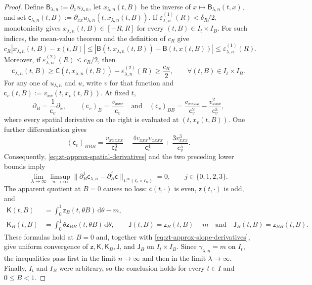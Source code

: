 \documentclass[10pt]{amsart}
\theoremstyle{definition}
\theoremstyle{remark}
\numberwithin{equation}{section}
\newcommand{\1}{\mathbf 1}
\newcommand{\dd}{\,\mathrm d}
\begin{document}
\begin{proof}
Define $\mathsf B_{\lambda,n}:=\partial_xu_{\lambda,n}$, let $x_{\lambda,n}(t,B)$ be the inverse of $x\mapsto\mathsf B_{\lambda,n}(t,x)$, and set $\mathsf c_{\lambda,n}(t,B):=\partial_{xx}u_{\lambda,n}(t,x_{\lambda,n}(t,B))$. If $\varepsilon_{\lambda,n}^{(1)}(R)<\delta_R/2$, monotonicity gives $x_{\lambda,n}(t,B)\in[-R,R]$ for every $(t,B)\in I_t\times I_B$. For such indices, the mean-value theorem and the definition of $c_R$ give
\begin{equation*}
 c_R|x_{\lambda,n}(t,B)-x(t,B)|
 \leq|\mathsf B(t,x_{\lambda,n}(t,B))-\mathsf B(t,x(t,B))|
 \leq\varepsilon_{\lambda,n}^{(1)}(R).
\end{equation*}
Moreover, if $\varepsilon_{\lambda,n}^{(2)}(R)\leq c_R/2$, then
\begin{equation*}
 \mathsf c_{\lambda,n}(t,B)\geq\mathsf C(t,x_{\lambda,n}(t,B))-\varepsilon_{\lambda,n}^{(2)}(R)\geq\frac{c_R}{2},
 \qquad \forall (t,B)\in I_t\times I_B.
\end{equation*}
For any one of $u_{\lambda,n}$ and $u$, write $v$ for that function and $\mathsf c_v(t,B):=v_{xx}(t,x_v(t,B))$. At fixed $t$,
\begin{equation*}
 \partial_B=\frac1{\mathsf c_v}\partial_x,\qquad (\mathsf c_v)_B=\frac{v_{xxx}}{\mathsf c_v}
 \quad\text{and}\quad
 (\mathsf c_v)_{BB}=\frac{v_{xxxx}}{\mathsf c_v^2}-\frac{v_{xxx}^2}{\mathsf c_v^3},
\end{equation*}
where every spatial derivative on the right is evaluated at $(t,x_v(t,B))$. One further differentiation gives
\begin{equation*}
 (\mathsf c_v)_{BBB}=\frac{v_{xxxxx}}{\mathsf c_v^3}
 -\frac{4v_{xxx}v_{xxxx}}{\mathsf c_v^4}
 +\frac{3v_{xxx}^3}{\mathsf c_v^5}.
\end{equation*}
Consequently, \eqref{eq:zt-approx-spatial-derivatives} and the two preceding lower bounds imply
\begin{equation}
 \lim_{\lambda\to\infty}\limsup_{n\to\infty}
 \|\partial_B^j\mathsf c_{\lambda,n}-\partial_B^j\mathsf c\|_{L^\infty(I_t\times I_B)}=0,
 \qquad j\in\{0,1,2,3\}.
 \label{eq:zt-approx-slope-derivatives}
\end{equation}
The apparent quotient at $B=0$ causes no loss: $\mathsf c(t,\cdot)$ is even, $\mathsf z(t,\cdot)$ is odd, and
\begin{align*}
 \mathsf K(t,B)&=\int_0^1\mathsf z_B(t,\theta B)\dd\theta-m,\\
 \mathsf K_B(t,B)&=\int_0^1\theta\mathsf z_{BB}(t,\theta B)\dd\theta,\qquad
 \mathsf J(t,B)=\mathsf z_B(t,B)-m\quad\text{and}\quad \mathsf J_B(t,B)=\mathsf z_{BB}(t,B).
\end{align*}
These formulas hold at $B=0$ and, together with \eqref{eq:zt-approx-slope-derivatives}, give uniform convergence of $\mathsf z,\mathsf K,\mathsf K_B,\mathsf J$, and $\mathsf J_B$ on $I_t\times I_B$. Since $\gamma_{\lambda,n}=m$ on $I_t$, the inequalities pass first in the limit $n\to\infty$ and then in the limit $\lambda\to\infty$. Finally, $I_t$ and $I_B$ were arbitrary, so the conclusion holds for every $t\in I$ and $0\leq B<1$.
\end{proof}
\end{document}

